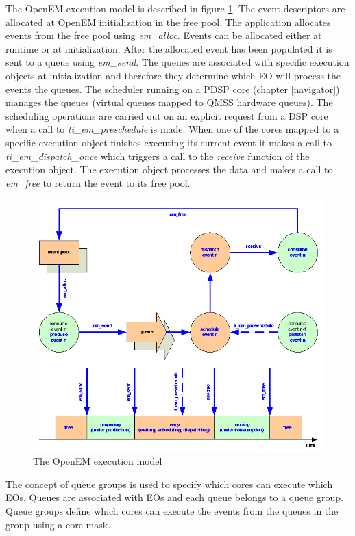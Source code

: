 The OpenEM execution model is described in figure \ref{tiem}. The event descriptors are allocated at OpenEM initialization in the free pool. The application allocates events from the free pool using \textit{em\_alloc}. Events can be allocated either at runtime or at initialization. After the allocated event has been populated it is sent to a queue using \textit{em\_send}. The queues are associated with specific execution objects at initialization and therefore they determine which EO will process the events the queues. The scheduler running on a PDSP core (chapter \ref{navigator}) manages the queues (virtual queues mapped to QMSS hardware queues). The scheduling operations are carried out on an explicit request from a DSP core when a call to \textit{ti\_em\_preschedule} is made. When one of the cores mapped to a specific execution object finishes executing its current event it makes a call to \textit{ti\_em\_dispatch\_once} which triggers a call to the \textit{receive} function of the execution object. The execution object processes the data and makes a call to \textit{em\_free} to return the event to its free pool.
\begin{figure}[h!]
\begin{center}
\includegraphics[width=1.3\textwidth,natwidth=701,natheight=500]{openem_model.png}
\caption{The OpenEM execution model}\label{tiem}
\end{center}
\end{figure}

The concept of queue groups is used to specify which cores can execute which EOs. Queues are associated with EOs and each queue belongs to a queue group. Queue groups define which cores can execute the events from the queues in the group using a core mask.

